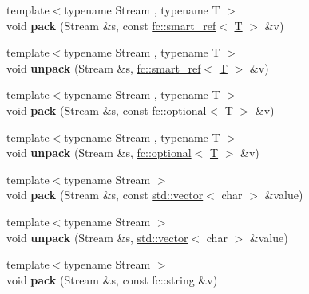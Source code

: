 \begin{DoxyCompactItemize}
{\footnotesize template$<$typename Stream , typename T $>$ }\\void {\bfseries pack} (Stream \&s, const \mbox{\hyperlink{classfc_1_1smart__ref}{fc\+::smart\+\_\+ref}}$<$ \mbox{\hyperlink{struct_t}{T}} $>$ \&v)
\item 
\mbox{\label{namespacefc_1_1raw_a0a770969e7002d7acf0413c1ea23a636}} 
{\footnotesize template$<$typename Stream , typename T $>$ }\\void {\bfseries unpack} (Stream \&s, \mbox{\hyperlink{classfc_1_1smart__ref}{fc\+::smart\+\_\+ref}}$<$ \mbox{\hyperlink{struct_t}{T}} $>$ \&v)
\item 
\mbox{\label{namespacefc_1_1raw_a9032141dfab0e0a7024123469dae5017}} 
{\footnotesize template$<$typename Stream , typename T $>$ }\\void {\bfseries pack} (Stream \&s, const \mbox{\hyperlink{classfc_1_1optional}{fc\+::optional}}$<$ \mbox{\hyperlink{struct_t}{T}} $>$ \&v)
\item 
\mbox{\label{namespacefc_1_1raw_ace3c18de607b2aafde45df01eb72d3c2}} 
{\footnotesize template$<$typename Stream , typename T $>$ }\\void {\bfseries unpack} (Stream \&s, \mbox{\hyperlink{classfc_1_1optional}{fc\+::optional}}$<$ \mbox{\hyperlink{struct_t}{T}} $>$ \&v)
\item 
\mbox{\label{namespacefc_1_1raw_a725f8a4a02d00634515f84852d6f2a1f}} 
{\footnotesize template$<$typename Stream $>$ }\\void {\bfseries pack} (Stream \&s, const \mbox{\hyperlink{classstd_1_1vector}{std\+::vector}}$<$ char $>$ \&value)
\item 
\mbox{\label{namespacefc_1_1raw_aa169baf1201da018a31a44188749e486}} 
{\footnotesize template$<$typename Stream $>$ }\\void {\bfseries unpack} (Stream \&s, \mbox{\hyperlink{classstd_1_1vector}{std\+::vector}}$<$ char $>$ \&value)
\item 
\mbox{\label{namespacefc_1_1raw_a8ebbc74167fa3603e7f10b6c8673c8c8}} 
{\footnotesize template$<$typename Stream $>$ }\\void {\bfseries pack} (Stream \&s, const fc\+::string \&v)

\end{DoxyCompactItemize}
